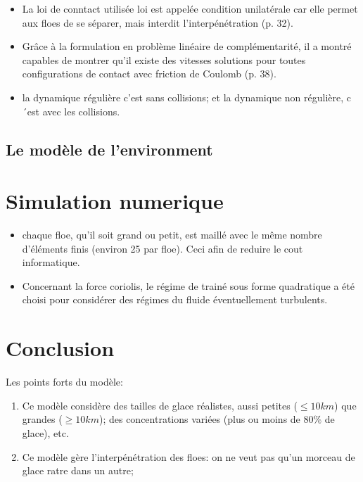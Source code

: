 \documentclass[
  french,
	11pt, %
]{fphw}
\begin{document}
\begin{itemize}
  \item La loi de conntact utilisée loi est appelée condition unilatérale car elle permet aux floes de se séparer, mais interdit l’interpénétration (p. 32).
  \item Grâce à la formulation en problème linéaire de complémentarité, il a montré capables de montrer qu’il existe des vitesses solutions pour toutes configurations de contact avec friction de Coulomb (p. 38). 
  \item la dynamique régulière c'est sans collisions; et la dynamique non régulière, c´est avec les collisions.
\end{itemize}

\subsection{Le modèle de l'environment}

\section{Simulation numerique}
\begin{itemize}
  \item chaque floe, qu’il soit grand ou petit, est maillé avec le même nombre d’éléments finis (environ 25 par floe). Ceci afin de reduire le cout informatique.
\end{itemize}

\begin{itemize}
  \item Concernant la force coriolis, le régime de trainé sous forme quadratique a été choisi pour considérer des régimes du fluide éventuellement
  turbulents. 
\end{itemize}


\section*{Conclusion}

Les points forts du modèle:
\begin{enumerate}
  \item Ce modèle considère des tailles de glace réalistes, aussi petites ($\leq 10 km$) que grandes ($\geq 10 km$); des concentrations variées (plus ou moins de $80 \%$ de glace), etc.
  \item Ce modèle gère l'interpénétration des floes: on ne veut pas qu'un morceau de glace ratre dans un autre;
\end{enumerate}
\end{document}

